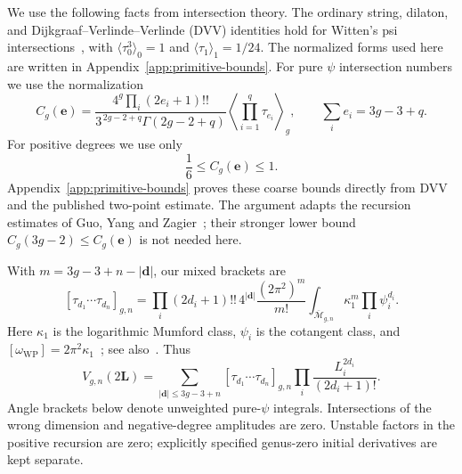 We use the following facts from intersection theory. The ordinary string,
dilaton, and Dijkgraaf--Verlinde--Verlinde (DVV) identities hold for Witten's psi
intersections~\cite{Witten,Kontsevich,DVV}, with
\(\langle\tau_0^3\rangle_0=1\) and \(\langle\tau_1\rangle_1=1/24\). The normalized forms used here are written in Appendix~\ref{app:primitive-bounds}. For
pure $\psi$ intersection numbers we use the normalization \begin{equation}
C_g(\mathbf e)=
\frac{4^g\prod_i(2e_i+1)!!}
 {3^{\,2g-2+q}\Gamma(2g-2+q)}
\left\langle\prod_{i=1}^q\tau_{e_i}\right\rangle_g,
\qquad \sum_i e_i=3g-3+q.
\label{eq:H4}
\end{equation} For positive degrees we use only
\[
 \frac16\le C_g(\mathbf e)\le1.
\]
Appendix~\ref{app:primitive-bounds} proves these coarse bounds directly
from DVV and the published two-point estimate. The argument adapts the
recursion estimates of Guo, Yang and Zagier~\cite{GYZ}; their stronger
lower bound $C_g(3g-2)\le C_g(\mathbf e)$ is not needed here.

With \(m=3g-3+n-|\mathbf d|\), our mixed brackets are
\[
 [\tau_{d_1}\cdots\tau_{d_n}]_{g,n}
 =\prod_i(2d_i+1)!!\,4^{|\mathbf d|}\frac{(2\pi^2)^m}{m!}
 \int_{\overline{\mathcal M}_{g,n}}\kappa_1^m\prod_i\psi_i^{d_i}.
\]
Here \(\kappa_1\) is the logarithmic Mumford class, \(\psi_i\) is the cotangent class, and \([\omega_{\mathrm{WP}}]=2\pi^2\kappa_1\)~\cite{Wolpert}; see also~\cite[Section~2]{MZ}. Thus
\[
 V_{g,n}(2\mathbf L)=\sum_{|\mathbf d|\le3g-3+n}
 [\tau_{d_1}\cdots\tau_{d_n}]_{g,n}
 \prod_i\frac{L_i^{2d_i}}{(2d_i+1)!}.
\]
Angle brackets below denote unweighted pure-$\psi$ integrals. Intersections of the wrong dimension and negative-degree amplitudes are zero. Unstable factors in the positive recursion are zero; explicitly specified genus-zero initial derivatives are kept separate.

